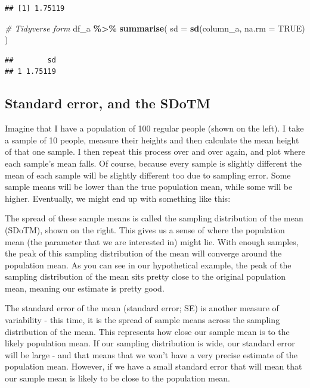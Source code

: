 \documentclass[
]{book}
\newenvironment{Shaded}{\begin{snugshade}}{\end{snugshade}}
\newcommand{\AttributeTok}[1]{\textcolor[rgb]{0.13,0.29,0.53}{#1}}
\newcommand{\CommentTok}[1]{\textcolor[rgb]{0.56,0.35,0.01}{\textit{#1}}}
\newcommand{\ConstantTok}[1]{\textcolor[rgb]{0.56,0.35,0.01}{#1}}
\newcommand{\FunctionTok}[1]{\textcolor[rgb]{0.13,0.29,0.53}{\textbf{#1}}}
\newcommand{\NormalTok}[1]{#1}
\newcommand{\SpecialCharTok}[1]{\textcolor[rgb]{0.81,0.36,0.00}{\textbf{#1}}}
\begin{document}
\begin{verbatim}
## [1] 1.75119
\end{verbatim}

\begin{Shaded}
\begin{Highlighting}[]
\CommentTok{\# Tidyverse form}
\NormalTok{df\_a }\SpecialCharTok{\%\textgreater{}\%}
  \FunctionTok{summarise}\NormalTok{(}
    \AttributeTok{sd =} \FunctionTok{sd}\NormalTok{(column\_a, }\AttributeTok{na.rm =} \ConstantTok{TRUE}\NormalTok{)}
\NormalTok{  )}
\end{Highlighting}
\end{Shaded}

\begin{verbatim}
##        sd
## 1 1.75119
\end{verbatim}

\subsection{Standard error, and the SDoTM}\label{sderr}

Imagine that I have a population of 100 regular people (shown on the left). I take a sample of 10 people, measure their heights and then calculate the mean height of that one sample. I then repeat this process over and over again, and plot where each sample's mean falls. Of course, because every sample is slightly different the mean of each sample will be slightly different too due to sampling error. Some sample means will be lower than the true population mean, while some will be higher. Eventually, we might end up with something like this:

The spread of these sample means is called the sampling distribution of the mean (SDoTM), shown on the right. This gives us a sense of where the population mean (the parameter that we are interested in) might lie. With enough samples, the peak of this sampling distribution of the mean will converge around the population mean. As you can see in our hypothetical example, the peak of the sampling distribution of the mean sits pretty close to the original population mean, meaning our estimate is pretty good.

The standard error of the mean (standard error; SE) is another measure of variability - this time, it is the spread of sample means across the sampling distribution of the mean. This represents how close our sample mean is to the likely population mean. If our sampling distribution is wide, our standard error will be large - and that means that we won't have a very precise estimate of the population mean. However, if we have a small standard error that will mean that our sample mean is likely to be close to the population mean.
\end{document}
